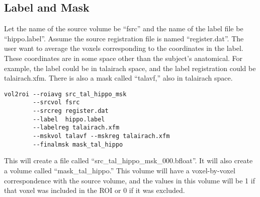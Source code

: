 \documentclass[10pt]{article}
\begin{document}
\subsection{Label and Mask}

Let the name of the source volume be ``fsrc'' and the name of the
label file be ``hippo.label''.  Assume the source registration file is
named ``register.dat''. The user want to average the voxels
corresponding to the coordinates in the label. These coordinates are
in some space other than the subject's anatomical. For example, the
label could be in talairach space, and the label registration could be
talairach.xfm. There is also a mask called ``talavf,'' also in
talairach space.
\begin{verbatim}
vol2roi --roiavg src_tal_hippo_msk
        --srcvol fsrc 
        --srcreg register.dat 
        --label  hippo.label
        --labelreg talairach.xfm
        --mskvol talavf --mskreg talairach.xfm
        --finalmsk mask_tal_hippo
\end{verbatim}
This will create a file called
``src\_tal\_hippo\_msk\_000.bfloat''. It will also create a volume
called ``mask\_tal\_hippo.'' This volume will have a voxel-by-voxel
correspondence with the source volume, and the values in this volume
will be 1 if that voxel was included in the ROI or 0 if it was excluded.
\end{document}
